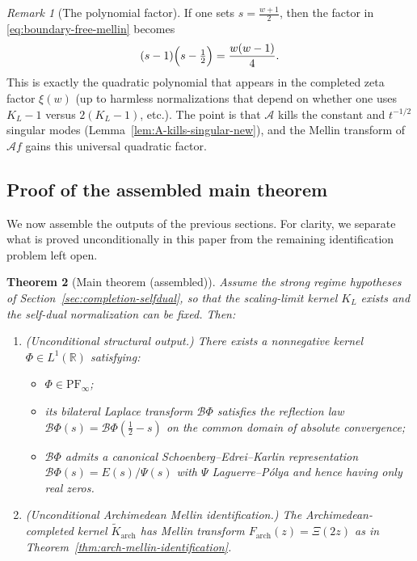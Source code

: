 \documentclass[12pt]{amsart}
\newtheorem{theorem}{Theorem}[section]
\theoremstyle{definition}
\theoremstyle{remark}
\newtheorem{remark}[theorem]{Remark}
\begin{document}
\begin{remark}[The polynomial factor]
If one sets $s=\frac{w+1}{2}$, then the factor in \eqref{eq:boundary-free-mellin} becomes
\[
(s-1)\Bigl(s-\tfrac12\Bigr)=\frac{w(w-1)}{4}.
\]
This is exactly the quadratic polynomial that appears in the completed zeta factor
$\xi(w)$ (up to harmless normalizations that depend on whether one uses
$K_L-1$ versus $2(K_L-1)$, etc.). The point is that $\mathcal A$ kills the constant
and $t^{-1/2}$ singular modes (Lemma~\ref{lem:A-kills-singular-new}), and the Mellin
transform of $\mathcal A f$ gains this universal quadratic factor.
\end{remark}

\subsection{Proof of the assembled main theorem}
\label{subsec:proof-main}

We now assemble the outputs of the previous sections. For clarity, we separate
what is proved unconditionally in this paper from the remaining identification problem left open.

\begin{theorem}[Main theorem (assembled)]
\label{thm:main-assembled}
Assume the strong regime hypotheses of Section~\ref{sec:completion-selfdual}, so that the scaling-limit kernel
$K_L$ exists and the self-dual normalization can be fixed. Then:
\begin{enumerate}[label=(\roman*)]
\item (\emph{Unconditional structural output.})
There exists a nonnegative kernel $\Phi\in L^1(\mathbb R)$ satisfying:
\begin{itemize}
\item $\Phi\in\mathrm{PF}_\infty$;
\item its bilateral Laplace transform $\mathcal B\Phi$ satisfies the reflection law
$\mathcal B\Phi(s)=\mathcal B\Phi(\tfrac12-s)$ on the common domain of absolute convergence;
\item $\mathcal B\Phi$ admits a canonical Schoenberg--Edrei--Karlin representation
$\mathcal B\Phi(s)=E(s)/\Psi(s)$ with $\Psi$ Laguerre--P\'olya and hence having only real zeros.
\end{itemize}
\item (\emph{Unconditional Archimedean Mellin identification.})
The Archimedean-completed kernel $\widetilde K_{\mathrm{arch}}$ has Mellin transform
$F_{\mathrm{arch}}(z)=\Xi(2z)$ as in Theorem~\ref{thm:arch-mellin-identification}.
\end{enumerate}
\end{theorem}
\end{document}
